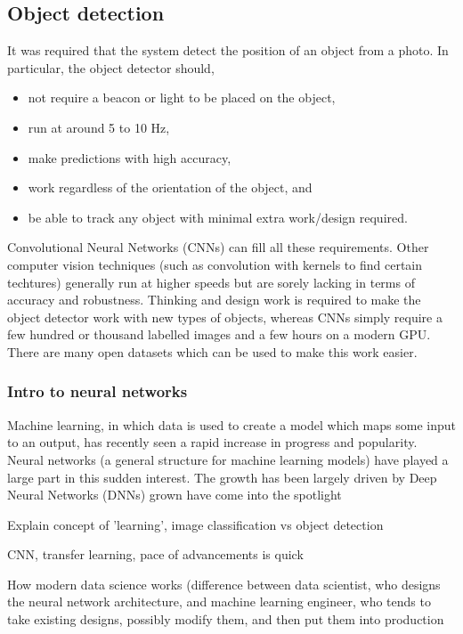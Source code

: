 \subsection{Object detection}
It was required that the system detect the position of an object from a photo. In particular, the object detector should,

\begin{itemize}
	\item not require a beacon or light to be placed on the object,
	\item run at around 5 to 10 Hz,
	\item make predictions with high accuracy,
	\item work regardless of the orientation of the object, and
	\item be able to track any object with minimal extra work/design required.
\end{itemize}

Convolutional Neural Networks (CNNs) can fill all these requirements. Other computer vision techniques (such as convolution with kernels to find certain techtures) generally run at higher speeds but are sorely lacking in terms of accuracy and robustness. Thinking and design work is required to make the object detector work with new types of objects, whereas CNNs simply require a few hundred or thousand labelled images and a few hours on a modern GPU. There are many open datasets which can be used to make this work easier.

\subsubsection{Intro to neural networks}
Machine learning, in which data is used to create a model which maps some input to an output, has recently seen a rapid increase in progress and popularity. Neural networks (a general structure for machine learning models) have played a large part in this sudden interest. The growth has been largely driven by Deep Neural Networks (DNNs) grown have come into the spotlight 

Explain concept of 'learning', image classification vs object detection

CNN, transfer learning, pace of advancements is quick

How modern data science works (difference between data scientist, who designs the neural network architecture, and machine learning engineer, who tends to take existing designs, possibly modify them, and then put them into production

